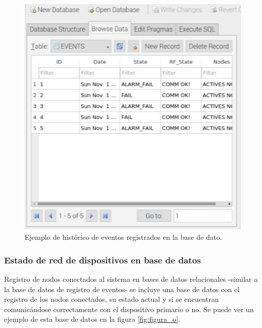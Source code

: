 \break

\begin{figure}[ht]

	\centering
	\includegraphics[scale=.45]{./Figures/Capitulo4/Figura_P.png}
	\caption{Ejemplo de histórico de eventos registrados en la base de dato.}
	\label{fig:figura_p}
\end{figure}
\subsubsection{Estado de red de dispositivos en base de datos}
Registro de nodos conectados al sistema en bases de datos relacionales -similar a la base de datos de registro de eventos- se incluye una base de datos con el registro de los nodos conectados, su estado actual y si se encuentran comunicándose correctamente con el dispositivo primario o no. Se puede ver un ejemplo de esta base de datos en la figura \ref{fig:figura_o}.


